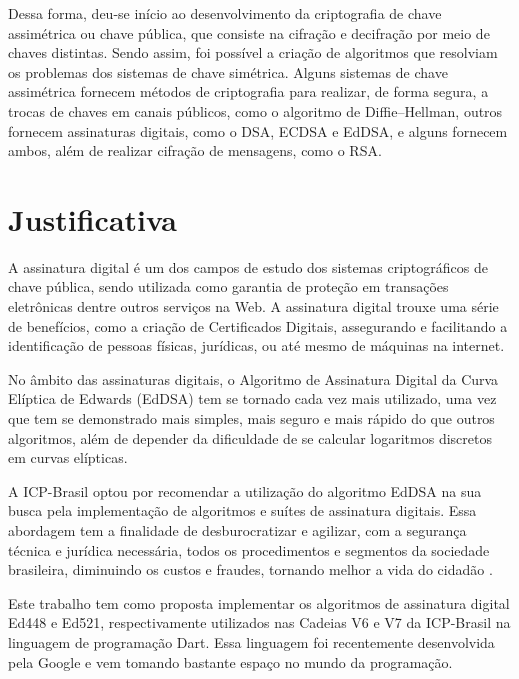 Dessa forma, deu-se início ao desenvolvimento da criptografia de chave assimétrica ou chave pública, que consiste na cifração e decifração por meio de chaves distintas. Sendo assim, foi possível a criação de algoritmos que resolviam os problemas dos sistemas de chave simétrica. Alguns sistemas de chave assimétrica fornecem métodos de criptografia para realizar, de forma segura, a trocas de chaves em canais públicos, como o algoritmo de Diffie–Hellman, outros fornecem assinaturas digitais, como o DSA, ECDSA e EdDSA, e alguns fornecem ambos, além de realizar cifração de mensagens, como o RSA.

\section{Justificativa}

A assinatura digital é um dos campos de estudo dos sistemas criptográficos de chave pública, sendo utilizada como garantia de proteção em transações eletrônicas dentre outros serviços na Web. A assinatura digital trouxe uma série de benefícios, como a criação de Certificados Digitais, assegurando e facilitando a identificação de pessoas físicas, jurídicas, ou até mesmo de máquinas na internet. 

No âmbito das assinaturas digitais, o Algoritmo de Assinatura Digital da Curva Elíptica de Edwards (EdDSA) tem se tornado cada vez mais utilizado, uma vez que tem se demonstrado mais simples, mais seguro e mais rápido do que outros algoritmos, além de depender da dificuldade de se calcular logaritmos discretos em curvas elípticas. 

A ICP-Brasil optou por recomendar a utilização do algoritmo EdDSA na sua busca pela implementação de algoritmos e suítes de assinatura digitais. Essa abordagem tem a finalidade de desburocratizar e agilizar, com a segurança técnica e jurídica necessária, todos os procedimentos e segmentos da sociedade brasileira, diminuindo os custos e fraudes, tornando melhor a vida do cidadão \cite{iti2018}.

Este trabalho tem como proposta implementar os algoritmos de assinatura digital Ed448 e Ed521, respectivamente utilizados nas Cadeias V6 e V7 da ICP-Brasil na linguagem de programação Dart. Essa linguagem foi recentemente desenvolvida pela Google e vem tomando bastante espaço no mundo da programação.


